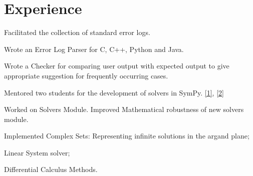 \documentclass[]{deedy-resume-openfont}
\begin{document}
\begin{minipage}[t]{0.66\textwidth} 


\section{Experience}

\vspace{\topsep} %
\sectionsep

\vspace{\topsep} %
\begin{tightemize}
\item Facilitated the collection of standard error logs.
\item Wrote an Error Log Parser for C, C++, Python and Java.
\item Wrote a Checker for comparing user output with expected output to give appropriate suggestion for frequently occurring cases. 
\end{tightemize}
\sectionsep

\vspace{\topsep} %
\begin{tightemize}\item Mentored two students for the development of solvers in SymPy. \href{https://summerofcode.withgoogle.com/projects/#6299625891823616}{[1]}, 
\href{https://summerofcode.withgoogle.com/projects/#5440294841483264}{[2]}
\end{tightemize}
\sectionsep

\begin{tightemize}
\item Worked on Solvers Module. Improved Mathematical robustness of new solvers module.
\item Implemented Complex Sets: Representing infinite solutions in the argand plane;
\item Linear System solver;
\item Differential Calculus Methods.\end{tightemize}
\sectionsep


\end{minipage}
\end{document}
